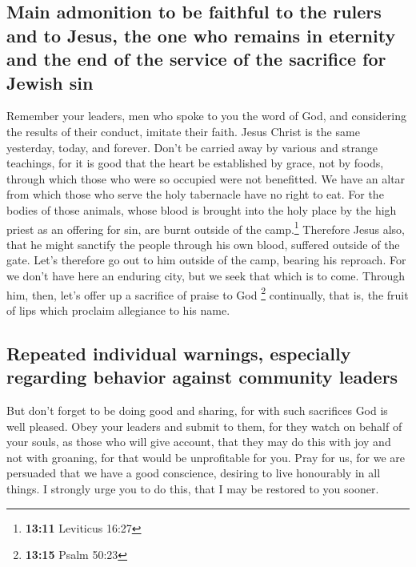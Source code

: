 \hypertarget{main-admonition-to-be-faithful-to-the-rulers-and-to-jesus-the-one-who-remains-in-eternity-and-the-end-of-the-service-of-the-sacrifice-for-jewish-sin}{%
\subsection{Main admonition to be faithful to the rulers and to Jesus,
the one who remains in eternity and the end of the service of the
sacrifice for Jewish
sin}\label{main-admonition-to-be-faithful-to-the-rulers-and-to-jesus-the-one-who-remains-in-eternity-and-the-end-of-the-service-of-the-sacrifice-for-jewish-sin}}

 Remember your leaders, men who spoke to you the word of
God, and considering the results of their conduct, imitate their faith.
 Jesus Christ is the same yesterday, today, and forever.
 Don't be carried away by various and strange teachings,
for it is good that the heart be established by grace, not by foods,
through which those who were so occupied were not benefitted.
 We have an altar from which those who serve the holy
tabernacle have no right to eat.  For the bodies of those
animals, whose blood is brought into the holy place by the high priest
as an offering for sin, are burnt outside of the camp.\footnote{\textbf{13:11}
  Leviticus 16:27}  Therefore Jesus also, that he might
sanctify the people through his own blood, suffered outside of the gate.
 Let's therefore go out to him outside of the camp,
bearing his reproach.  For we don't have here an enduring
city, but we seek that which is to come.  Through him,
then, let's offer up a sacrifice of praise to God \footnote{\textbf{13:15}
  Psalm 50:23} continually, that is, the fruit of lips which proclaim
allegiance to his name.

\hypertarget{repeated-individual-warnings-especially-regarding-behavior-against-community-leaders}{%
\subsection{Repeated individual warnings, especially regarding behavior
against community
leaders}\label{repeated-individual-warnings-especially-regarding-behavior-against-community-leaders}}

 But don't forget to be doing good and sharing, for with
such sacrifices God is well pleased.  Obey your leaders
and submit to them, for they watch on behalf of your souls, as those who
will give account, that they may do this with joy and not with groaning,
for that would be unprofitable for you.  Pray for us, for
we are persuaded that we have a good conscience, desiring to live
honourably in all things.  I strongly urge you to do
this, that I may be restored to you sooner.

